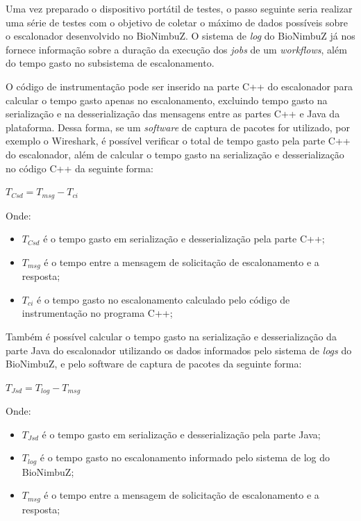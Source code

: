 Uma vez preparado o dispositivo portátil de testes, o passo seguinte seria realizar uma série de testes com o objetivo de coletar o máximo de dados possíveis sobre o escalonador desenvolvido no BioNimbuZ. O sistema de \textit{log} do BioNimbuZ já nos fornece informação sobre a duração da execução dos \textit{jobs} de um \textit{workflows}, além do tempo gasto no subsistema de escalonamento. 

O código de instrumentação pode ser inserido na parte C++ do escalonador para calcular o tempo gasto apenas no escalonamento, excluindo tempo gasto na serialização e na desserialização das mensagens entre as partes C++ e Java da plataforma. Dessa forma, se um \textit{software} de captura de pacotes for utilizado, por exemplo o Wireshark\cite{Wireshark}, é possível verificar o total de tempo gasto pela parte C++ do escalonador, além de calcular o tempo gasto na serialização e desserialização no código C++ da seguinte forma:

\centerline{ $T_{Csd} = T_{msg} - T_{ci}$ }

Onde: 
 \begin{itemize}
 	\item $T_{Csd}$ é o tempo gasto em serialização e desserialização pela parte C++;
 	\item $T_{msg}$ é o tempo entre a mensagem de solicitação de escalonamento e a resposta;
 	\item $T_{ci}$ é o tempo gasto no escalonamento calculado pelo código de instrumentação no programa C++;
 \end{itemize}

Também é possível calcular o tempo gasto na serialização e desserialização da parte Java do escalonador utilizando os dados informados pelo sistema de \textit{logs} do BioNimbuZ, e pelo software de captura de pacotes da seguinte forma:

\centerline{ $T_{Jsd} = T_{log} - T_{msg}$ }

Onde: 
\begin{itemize}
	\item $T_{Jsd}$ é o tempo gasto em serialização e desserialização pela parte Java;
	\item $T_{log}$ é o tempo gasto no escalonamento informado pelo sistema de log do BioNimbuZ;
	\item $T_{msg}$ é o tempo entre a mensagem de solicitação de escalonamento e a resposta;
\end{itemize}

